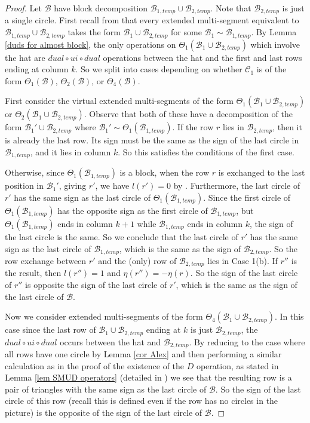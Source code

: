 \documentclass[11pt,letterpaper]{amsart}
\newcommand{\BB}{\mathcal{B}}
\newcommand{\CC}{\mathcal{C}}
\numberwithin{equation}{section}
\begin{document}
\begin{proof}
    Let $\BB$ have block decomposition $\BB_{1, temp} \cup \BB_{2, temp}$. Note that $\BB_{2, temp}$ is just a single circle. First recall from \cite[Lemma 6.8]{HKT26} that every extended multi-segment equivalent to $\BB_{1, temp} \cup \BB_{2, temp}$ takes the form $\BB_1 \cup \BB_{2, temp}$ for some $\BB_1 \sim \BB_{1, temp}$. By Lemma \ref{duds for almost block}, the only operations on $\Theta_1(\BB_1\cup \BB_{2, temp})$ which involve the hat are $dual \circ ui \circ dual$ operations between the hat and the first and last rows ending at column $k$. So we split into cases depending on whether $\CC_1$ is of the form $\Theta_1(\BB)$, $\Theta_2(\BB)$, or $\Theta_4(\BB)$.
    
    First consider the virtual extended multi-segments of the form $\Theta_1(\BB_1 \cup \BB_{2, temp})$ or $\Theta_2(\BB_1\cup \BB_{2, temp})$. Observe that both of these have a decomposition of the form $\BB_1' \cup \BB_{2, temp}$ where $\BB_1' \sim \Theta_1(\BB_{1, temp})$. If the row $r$ lies in $\BB_{2, temp}$, then it is already the last row. Its sign must be the same as the sign of the last circle in $\BB_{1, temp}$, and it lies in column $k$. So this satisfies the conditions of the first case. 
    
    Otherwise, since $\Theta_1(\BB_{1, temp})$ is a block, when the row $r$ is exchanged to the last position in $\BB_1'$, giving $r'$, we have $l(r') = 0$ by \cite[Lemma 7.9]{HKT26}. Furthermore, the last circle of $r'$ has the same sign as the last circle of $\Theta_1(\BB_{1, temp})$. Since the first circle of $\Theta_1(\BB_{1, temp})$ has the opposite sign as the first circle of $\BB_{1, temp}$, but $\Theta_1(\BB_{1, temp})$ ends in column $k+1$ while $\BB_{1, temp}$ ends in column $k$, the sign of the last circle is the same. So we conclude that the last circle of $r'$ has the same sign as the last circle of $\BB_{1, temp}$, which is the same as the sign of $\BB_{2, temp}$. So the row exchange between $r'$ and the (only) row of $\BB_{2, temp}$ lies in Case 1(b). If $r''$ is the result, then $l(r'') = 1$ and $\eta(r'') = - \eta(r)$. So the sign of the last circle of $r''$ is opposite the sign of the last circle of $r'$, which is the same as the sign of the last circle of $\BB$.

    Now we consider extended multi-segments of the form $\Theta_4(\BB_1 \cup \BB_{2, temp})$. In this case since the last row of $\BB_1 \cup \BB_{2, temp}$ ending at $k$ is just $\BB_{2, temp}$, the $dual \circ ui \circ dual$ occurs between the hat and $\BB_{2, temp}$. By reducing to the case where all rows have one circle by Lemma \ref{cor Alex} and then performing a similar calculation as in the proof of the existence of the $D$ operation, as stated in Lemma \ref{lem SMUD operators} (detailed in \cite[Lemma 5.22]{HKT26}) we see that the resulting row is a pair of triangles with the same sign as the last circle of $\BB$. So the sign of the last circle of this row (recall this is defined even if the row has no circles in the picture) is the opposite of the sign of the last circle of $\BB$.
\end{proof}
\end{document}
